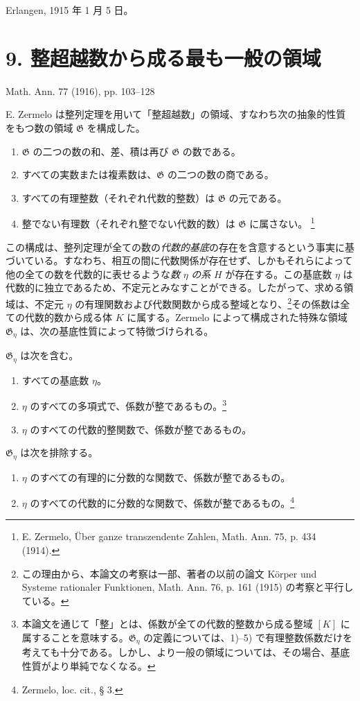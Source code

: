 \documentclass[11pt]{article}
\begin{document}
Erlangen, 1915 年 1 月 5 日。

\clearpage
\section*{9. 整超越数から成る最も一般の領域}
\begin{center}
Math. Ann. 77 (1916), pp. 103--128
\end{center}

E. Zermelo は整列定理を用いて「整超越数」の領域、すなわち次の抽象的性質をもつ数の領域 $\mathfrak G$ を構成した。
\begin{enumerate}
\item[I.] $\mathfrak G$ の二つの数の和、差、積は再び $\mathfrak G$ の数である。
\item[II.] すべての実数または複素数は、$\mathfrak G$ の二つの数の商である。
\item[III.] すべての有理整数（それぞれ代数的整数）は $\mathfrak G$ の元である。
\item[IV.] 整でない有理数（それぞれ整でない代数的数）は $\mathfrak G$ に属さない。
\footnote{E. Zermelo, Über ganze transzendente Zahlen, Math. Ann. 75, p. 434 (1914).}
\end{enumerate}

この構成は、整列定理が全ての数の\emph{代数的基底}の存在を含意するという事実に基づいている。すなわち、相互の間に代数関係が存在せず、しかもそれらによって他の全ての数を代数的に表せるような\emph{数} $\eta$ \emph{の系} $H$ が存在する。この基底数 $\eta$ は代数的に独立であるため、不定元とみなすことができる。したがって、求める領域は、不定元 $\eta$ の有理関数および代数関数から成る整域となり、\footnote{この理由から、本論文の考察は一部、著者の以前の論文 Körper und Systeme rationaler Funktionen, Math. Ann. 76, p. 161 (1915) の考察と平行している。}その係数は全ての代数的数から成る体 $K$ に属する。Zermelo によって構成された特殊な領域 $\mathfrak G_\eta$ は、次の基底性質によって特徴づけられる。

$\mathfrak G_\eta$ は次を含む。
\begin{enumerate}
\item[1)] すべての基底数 $\eta$。
\item[2)] $\eta$ のすべての多項式で、係数が整であるもの。\footnote{本論文を通じて「整」とは、係数が全ての代数的整数から成る整域 $[K]$ に属することを意味する。$\mathfrak G_\eta$ の定義については、1)--5) で有理整数係数だけを考えても十分である。しかし、より一般の領域については、その場合、基底性質がより単純でなくなる。}
\item[3)] $\eta$ のすべての代数的整関数で、係数が整であるもの。
\end{enumerate}
$\mathfrak G_\eta$ は次を排除する。
\begin{enumerate}
\item[4)] $\eta$ のすべての有理的に分数的な関数で、係数が整であるもの。
\item[5)] $\eta$ のすべての代数的に分数的な関数で、係数が整であるもの。\footnote{Zermelo, loc. cit., § 3.}
\end{enumerate}
\end{document}
